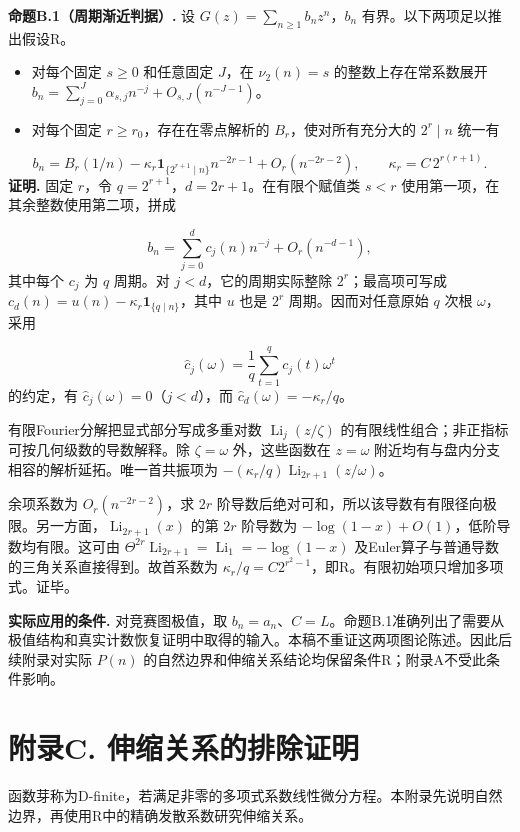 \documentclass[12pt,a4paper]{article}
\begin{document}
\textbf{命题B.1（周期渐近判据）.} 设 $G(z)=\sum_{n\ge1}b_nz^n$，$b_n$ 有界。以下两项足以推出假设R。

\begin{itemize}[leftmargin=*]
\item 对每个固定 $s\ge0$ 和任意固定 $J$，在 $\nu_2(n)=s$ 的整数上存在常系数展开 $b_n=\sum_{j=0}^J\alpha_{s,j}n^{-j}+O_{s,J}(n^{-J-1})$。
\item 对每个固定 $r\ge r_0$，存在在零点解析的 $B_r$，使对所有充分大的 $2^r\mid n$ 统一有
\end{itemize}
\[
b_n=B_r(1/n)-\kappa_r\mathbf1_{\{2^{r+1}\mid n\}}n^{-2r-1}+O_r(n^{-2r-2}),\qquad \kappa_r=C\,2^{r(r+1)}.
\]
\textbf{证明.} 固定 $r$，令 $q=2^{r+1}$，$d=2r+1$。在有限个赋值类 $s<r$ 使用第一项，在其余整数使用第二项，拼成

\[
b_n=\sum_{j=0}^{d}c_j(n)n^{-j}+O_r(n^{-d-1}),
\]
其中每个 $c_j$ 为 $q$ 周期。对 $j<d$，它的周期实际整除 $2^r$；最高项可写成 $c_d(n)=u(n)-\kappa_r\mathbf1_{\{q\mid n\}}$，其中 $u$ 也是 $2^r$ 周期。因而对任意原始 $q$ 次根 $\omega$，采用

\[
\widehat c_j(\omega)=\frac1q\sum_{t=1}^{q}c_j(t)\omega^t
\]
的约定，有 $\widehat c_j(\omega)=0$（$j<d$），而 $\widehat c_d(\omega)=-\kappa_r/q$。

有限Fourier分解把显式部分写成多重对数 $\operatorname{Li}_j(z/\zeta)$ 的有限线性组合；非正指标可按几何级数的导数解释。除 $\zeta=\omega$ 外，这些函数在 $z=\omega$ 附近均有与盘内分支相容的解析延拓。唯一首共振项为 $-(\kappa_r/q)\operatorname{Li}_{2r+1}(z/\omega)$。

余项系数为 $O_r(n^{-2r-2})$，求 $2r$ 阶导数后绝对可和，所以该导数有有限径向极限。另一方面，$\operatorname{Li}_{2r+1}(x)$ 的第 $2r$ 阶导数为 $-\log(1-x)+O(1)$，低阶导数均有限。这可由 $\Theta^{2r}\operatorname{Li}_{2r+1}=\operatorname{Li}_1=-\log(1-x)$ 及Euler算子与普通导数的三角关系直接得到。故首系数为 $\kappa_r/q=C2^{r^2-1}$，即R。有限初始项只增加多项式。证毕。

\textbf{实际应用的条件.} 对竞赛图极值，取 $b_n=a_n$、$C=L$。命题B.1准确列出了需要从极值结构和真实计数恢复证明中取得的输入。本稿不重证这两项图论陈述。因此后续附录对实际 $P(n)$ 的自然边界和伸缩关系结论均保留条件R；附录A不受此条件影响。

\section*{附录C. 伸缩关系的排除证明}
函数芽称为D-finite，若满足非零的多项式系数线性微分方程。本附录先说明自然边界，再使用R中的精确发散系数研究伸缩关系。
\end{document}
